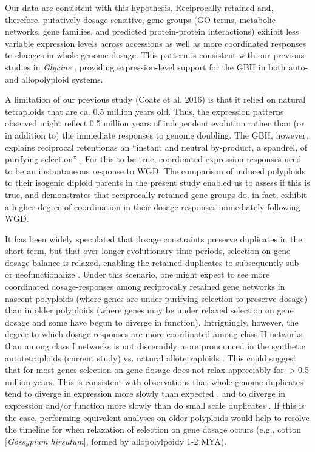 \documentclass[11pt]{article}
\begin{document}
Our data are consistent with this hypothesis. Reciprocally retained and, therefore, putatively dosage sensitive, gene groups (GO terms, metabolic networks, gene families, and predicted protein-protein interactions) exhibit less variable expression levels across accessions as well as more coordinated responses to changes in whole genome dosage. This pattern is consistent with our previous studies in {\it Glycine} \citep{coate2016}, providing expression-level support for the GBH in both auto- and allopolyploid systems. 

A limitation of our previous study (Coate et al. 2016) is that it relied on natural tetraploids that are ca. 0.5 million years old. Thus, the expression patterns observed might reflect 0.5 million years of independent evolution rather than (or in addition to) the immediate responses to genome doubling. The GBH, however, explains  reciprocal retentionas an ``instant and neutral by-product, a spandrel, of purifying selection'' \citep{freeling2009}. For this to be true, coordinated expression responses need to be an instantaneous response to WGD. The comparison of induced polyploids to their isogenic diploid parents in the present study enabled us to assess if this is true, and demonstrates that reciprocally retained gene groups do, in fact, exhibit a higher degree of coordination in their dosage responses immediately following WGD. 

It has been widely speculated that dosage constraints preserve duplicates in the short term, but that over longer evolutionary time periods, selection on gene dosage balance is relaxed, enabling the retained duplicates to subsequently sub- or neofunctionalize \citep{coate2011, schnable2012, conant2014, coate2016}. Under this scenario, one might expect to see more coordinated dosage-responses among reciprocally retained gene networks in nascent polyploids (where genes are under purifying selection to preserve dosage) than in older polyploids (where genes may be under relaxed selection on gene dosage and some have begun to diverge in function). Intriguingly, however, the degree to which dosage responses are more coordinated among class II networks than among class I networks is not discernibly more pronounced in the synthetic autotetraploids (current study) vs. natural allotetraploids \citep{coate2016}. This could suggest that for most genes selection on gene dosage does not relax appreciably for $>$0.5 million years. This is consistent with observations that whole genome duplicates tend to diverge in expression more slowly than expected \citep{rodgers2012, tasdighian2017}, and to diverge in expression and/or function more slowly than do small scale duplicates \citep{hakes2007, qiao2018, wang2011}. If this is the case, performing equivalent analyses on older polyploids would help to resolve the timeline for when relaxation of selection on gene dosage occurs (e.g., cotton [{\it Gossypium hirsutum}], formed by allopolylpoidy 1-2 MYA).
\end{document}
